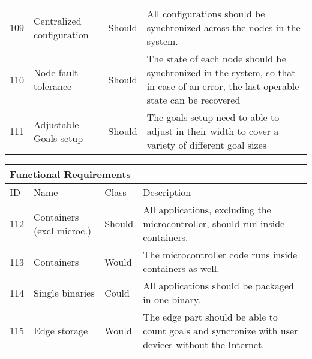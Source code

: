 \begin{table}[]
\begin{tabular}[t]{ l p{2.4cm} l p{7.6cm}}
        109 & Centralized configuration & Should         & All configurations should be synchronized across the nodes in the system.                                                          \\
        110 & Node fault tolerance      & Should         & The state of each node should be synchronized in the system, so that in case of an error, the last operable state can be recovered \\
        111 & Adjustable Goals setup    & Should         & The goals setup need to able to adjust in their width to cover a variety of different goal sizes                                   \\                  
        \end{tabular}\label{tab:funcReq}
    \end{table}
\begin{table}[]
    \begin{tabular}[t]{ l p{2.4cm} l p{7.6cm}}
        \multicolumn{4}{l}{Functional Requirements}                                                                                                                                           \\ \hline
        ID  & Name                      & Class & Description                                                                                                                        \\ \hline
        112 & Containers (excl microc.) & Should         & All applications, excluding the microcontroller, should run inside containers.                                                     \\      
        113 & Containers                & Would          & The microcontroller code runs inside containers as well.                                                                           \\
        114 & Single binaries           & Could          & All applications should be packaged in one binary.                                                                                 \\
        115 & Edge storage              & Would          & The edge part should be able to count goals and syncronize with user devices without the Internet.                                 \\                         
        \end{tabular}\label{tab:funcReq}
    \end{table}

